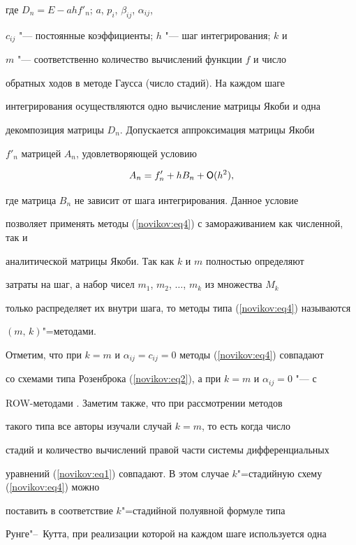где $D_n=E-ahf'_n$; $a$, $ p_i$, $\beta_{ij}$, $ \alpha_{ij}$,

$c_{ij}$ "--- постоянные коэффициенты; $h$ "--- шаг интегрирования; $k$ и

$m$ "--- соответственно количество вычислений функции $f$ и число

обратных ходов в методе Гаусса (число стадий). На каждом шаге

интегрирования осуществляются одно вычисление матрицы Якоби и одна

декомпозиция матрицы $D_n$. Допускается аппроксимация матрицы Якоби

$f'_n$ матрицей $A_n$, удовлетворяющей условию

\begin{equation*}

A_n=f'_n+hB_n+{\sf O}(h^2),

\end{equation*}

где матрица $B_n$ не зависит от шага интегрирования. Данное условие

позволяет применять методы (\ref{novikov:eq4}) с замораживанием как численной, так и

аналитической матрицы Якоби. Так как $k$ и $m$ полностью определяют

затраты на шаг, а набор чисел $m_1$, $m_2$, $\ldots$, $m_k$ из множества $M_k$

только распределяет их внутри шага, то методы типа (\ref{novikov:eq4}) называются

$(m,\,k)$"=методами.



Отметим, что при $k=m$ и $\alpha_{ij}=c_{ij}=0$ методы (\ref{novikov:eq4}) совпадают

со  схемами типа Розенброка (\ref{novikov:eq2}), а при $k=m$ и $\alpha_{ij}=0$ "--- с

ROW-методами \cite{Novikov:Hai}. Заметим также, что при рассмотрении  методов

такого типа все авторы изучали случай $k=m$, то есть когда число

стадий и количество вычислений правой части системы дифференциальных

уравнений (\ref{novikov:eq1}) совпадают. В этом случае $k$"=стадийную схему (\ref{novikov:eq4}) можно

поставить в соответствие $k$"=стадийной полуявной формуле типа

Рунге"--~Кутта, при реализации которой на каждом шаге используется одна

